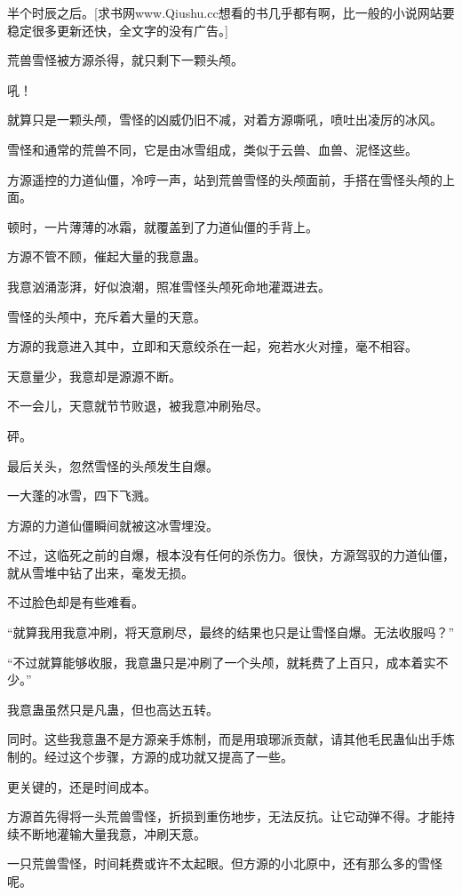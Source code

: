 
\begin{this_body}

半个时辰之后。[求书网www.Qiushu.cc想看的书几乎都有啊，比一般的小说网站要稳定很多更新还快，全文字的没有广告。]

荒兽雪怪被方源杀得，就只剩下一颗头颅。

吼！

就算只是一颗头颅，雪怪的凶威仍旧不减，对着方源嘶吼，喷吐出凌厉的冰风。

雪怪和通常的荒兽不同，它是由冰雪组成，类似于云兽、血兽、泥怪这些。

方源遥控的力道仙僵，冷哼一声，站到荒兽雪怪的头颅面前，手搭在雪怪头颅的上面。

顿时，一片薄薄的冰霜，就覆盖到了力道仙僵的手背上。

方源不管不顾，催起大量的我意蛊。

我意汹涌澎湃，好似浪潮，照准雪怪头颅死命地灌溉进去。

雪怪的头颅中，充斥着大量的天意。

方源的我意进入其中，立即和天意绞杀在一起，宛若水火对撞，毫不相容。

天意量少，我意却是源源不断。

不一会儿，天意就节节败退，被我意冲刷殆尽。

砰。

最后关头，忽然雪怪的头颅发生自爆。

一大蓬的冰雪，四下飞溅。

方源的力道仙僵瞬间就被这冰雪埋没。

不过，这临死之前的自爆，根本没有任何的杀伤力。很快，方源驾驭的力道仙僵，就从雪堆中钻了出来，毫发无损。

不过脸色却是有些难看。

“就算我用我意冲刷，将天意刷尽，最终的结果也只是让雪怪自爆。无法收服吗？”

“不过就算能够收服，我意蛊只是冲刷了一个头颅，就耗费了上百只，成本着实不少。”

我意蛊虽然只是凡蛊，但也高达五转。

同时。这些我意蛊不是方源亲手炼制，而是用琅琊派贡献，请其他毛民蛊仙出手炼制的。经过这个步骤，方源的成功就又提高了一些。

更关键的，还是时间成本。

方源首先得将一头荒兽雪怪，折损到重伤地步，无法反抗。让它动弹不得。才能持续不断地灌输大量我意，冲刷天意。

一只荒兽雪怪，时间耗费或许不太起眼。但方源的小北原中，还有那么多的雪怪呢。


\end{this_body}
